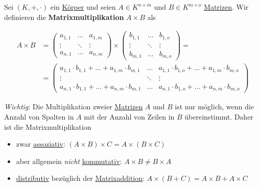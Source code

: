 \documentclass[../../main.tex]{subfiles}
\begin{document}
	\begin{definition}[Matrixmultiplikation]
		\label{def:Matrixmultiplikation}
		Sei $(K,+,\cdot)$ ein \hyperref[def:Körper]{Körper} und seien $A\in K^{n \times m}$ und $B \in K^{m \times o}$ \hyperref[def:Matrix]{Matrizen}. Wir definieren die \textbf{Matrixmultiplikation} $A\times B$ als
		
		\begin{align*}
			A \times B
			&=
			\begin{pmatrix}
			a_{1,1} & \dots & a_{1,m} \\
			\vdots  & \ddots & \vdots \\
			a_{n,1} & \dots & a_{n,m}
			\end{pmatrix}
			\times
			\begin{pmatrix}
			b_{1,1} & \dots & b_{1,o} \\
			\vdots  & \ddots & \vdots \\
			b_{m,1} & \dots & b_{m,o}
			\end{pmatrix}
			= \\ 
			&= 
			\begin{pmatrix}
				a_{1,1} \cdot b_{1,1} + \dots + a_{1,m} \cdot b_{m,1} & \dots & a_{1,1} \cdot b_{1,o} + \dots + a_{1,m} \cdot b_{m,o} \\
				\vdots  & \ddots & \vdots \\
				a_{n,1} \cdot b_{1,1} + \dots + a_{n,m} \cdot b_{m,1} & \dots & a_{n,1} \cdot b_{1,o} + \dots + a_{n,m} \cdot b_{m,o}
			\end{pmatrix}
		\end{align*}
		
		\textit{Wichtig}: Die Multiplikation zweier \hyperref[def:Matrix]{Matrizen} $A$ und $B$ ist nur möglich, wenn die Anzahl von Spalten in $A$ mit der Anzahl von Zeilen in $B$ übereinstimmt. Daher ist die Matrixmultiplikation
		\begin{itemize}
			\item zwar \hyperref[def:assoziativ]{assoziativ}: $(A \times B) \times C = A \times (B \times C)$
			\item aber allgemein \textit{nicht} \hyperref[def:kommutativ]{kommutativ}: $A \times B \not = B \times A$
			\item \hyperref[def:distributiv]{distributiv} bezüglich der \hyperref[def:Matrixaddition]{Matrixaddition}: $A \times (B+C) = A \times B + A \times C$
		\end{itemize}
	

\end{definition}
\end{document}
